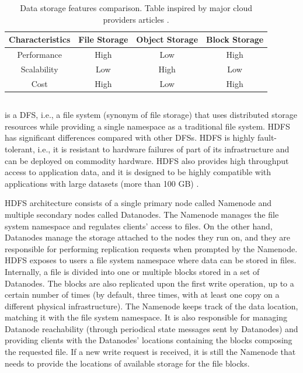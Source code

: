 \begin{table}[!ht]
    \begin{center}
      \caption[Data storage features comparison]{Data storage features comparison. Table inspired by major cloud providers articles \cite{BlockVsFile,HowObjectVs}.}
      \label{tab:storagecomparison}
      \begin{tabular}{cccc} %
        \toprule
        \textbf{Characteristics}\Tstrut\Bstrut & \textbf{File Storage} & \textbf{Object Storage} & \textbf{Block Storage}\\
        \midrule
        Performance & High & Low & High\Tstrut\\
        Scalability & Low & High & Low\\
        Cost & High & Low & High\Bstrut\\
        \bottomrule
      \end{tabular}
    \end{center}
\end{table}

\subsection{}

 is a \gls{DFS}, i.e., a file system (synonym of file storage) that uses distributed storage resources while providing a single namespace as a traditional file system. \gls{HDFS} has significant differences compared with other \glspl{DFS}. \gls{HDFS} is highly fault-tolerant, i.e., it is resistant to hardware failures of part of its infrastructure and can be deployed on commodity hardware. \gls{HDFS} also provides high throughput access to application data, and it is designed to be highly compatible with applications with large datasets (more than 100 GB) \cite{borthakurHadoopDistributedFile2005}. 

\gls{HDFS} architecture consists of a single primary node called Namenode and multiple secondary nodes called Datanodes. The Namenode manages the file system namespace and regulates clients' access to files. On the other hand, Datanodes manage the storage attached to the nodes they run on, and they are responsible for performing replication requests when prompted by the Namenode. \gls{HDFS} exposes to users a file system namespace where data can be stored in files. Internally, a file is divided into one or multiple blocks stored in a set of Datanodes. The blocks are also replicated upon the first write operation, up to a certain number of times (by default, three times, with at least one copy on a different physical infrastructure). The Namenode keeps track of the data location, matching it with the file system namespace. It is also responsible for managing Datanode reachability (through periodical state messages sent by Datanodes) and providing clients with the Datanodes' locations containing the blocks composing the requested file. If a new write request is received, it is still the Namenode that needs to provide the locations of available storage for the file blocks. 

